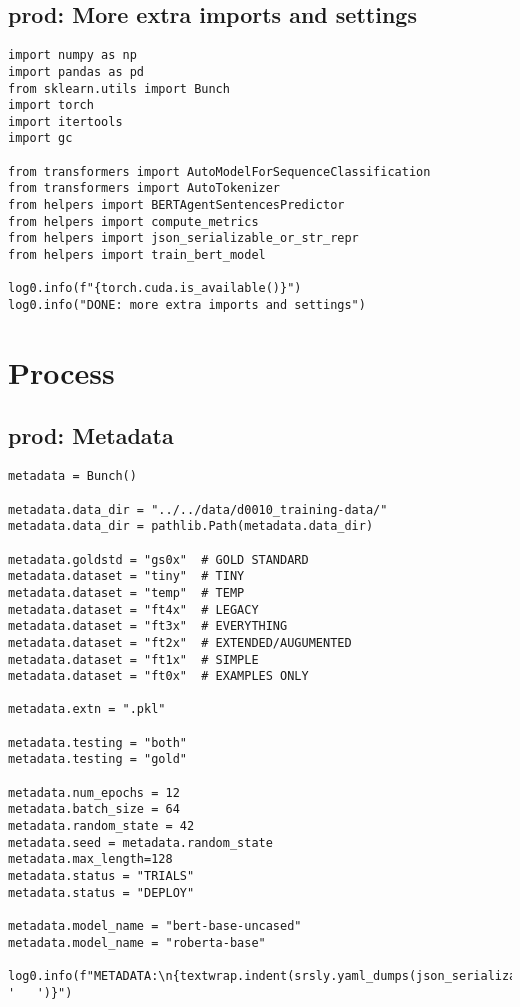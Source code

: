 \documentclass[a4paper,10pt,onecolumn,oneside,openright]{article}
\begin{document}
\subsection{prod: More extra imports and settings}
\label{sec:org66cfa91}
\begin{verbatim}
import numpy as np
import pandas as pd
from sklearn.utils import Bunch
import torch
import itertools
import gc

from transformers import AutoModelForSequenceClassification
from transformers import AutoTokenizer
from helpers import BERTAgentSentencesPredictor
from helpers import compute_metrics
from helpers import json_serializable_or_str_repr
from helpers import train_bert_model

log0.info(f"{torch.cuda.is_available()}")
log0.info("DONE: more extra imports and settings")
\end{verbatim}

\section{Process}
\label{sec:org075ed3e}
\subsection{prod: Metadata}
\label{sec:org742379d}
\begin{verbatim}
metadata = Bunch()

metadata.data_dir = "../../data/d0010_training-data/"
metadata.data_dir = pathlib.Path(metadata.data_dir)

metadata.goldstd = "gs0x"  # GOLD STANDARD
metadata.dataset = "tiny"  # TINY
metadata.dataset = "temp"  # TEMP
metadata.dataset = "ft4x"  # LEGACY
metadata.dataset = "ft3x"  # EVERYTHING
metadata.dataset = "ft2x"  # EXTENDED/AUGUMENTED
metadata.dataset = "ft1x"  # SIMPLE
metadata.dataset = "ft0x"  # EXAMPLES ONLY

metadata.extn = ".pkl"

metadata.testing = "both"
metadata.testing = "gold"

metadata.num_epochs = 12
metadata.batch_size = 64
metadata.random_state = 42
metadata.seed = metadata.random_state
metadata.max_length=128
metadata.status = "TRIALS"
metadata.status = "DEPLOY"

metadata.model_name = "bert-base-uncased"
metadata.model_name = "roberta-base"

log0.info(f"METADATA:\n{textwrap.indent(srsly.yaml_dumps(json_serializable_or_str_repr(dict(metadata))), '   ')}")
\end{verbatim}
\end{document}
